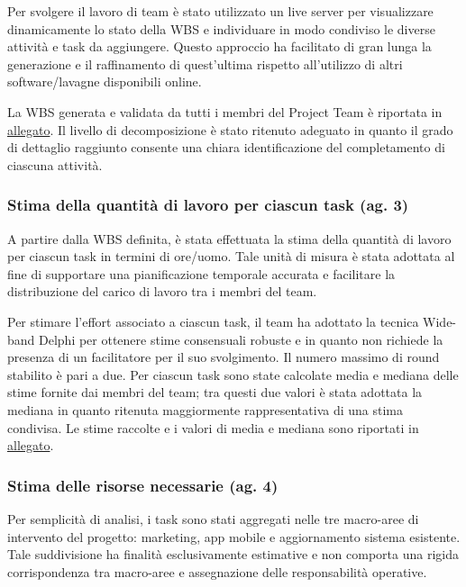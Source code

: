 \documentclass[11pt,a4paper]{article}
\begin{document}
{Per svolgere il lavoro di team è stato utilizzato un live server per visualizzare dinamicamente lo stato della WBS e individuare in modo condiviso le diverse attività e task da aggiungere. Questo approccio ha facilitato di gran lunga la generazione e il raffinamento di quest’ultima rispetto all’utilizzo di altri software/lavagne disponibili online.}

{La WBS generata e validata da tutti i membri del Project Team è riportata in \hyperref[sec:wbs]{allegato}. Il livello di decomposizione è stato ritenuto adeguato in quanto il grado di dettaglio raggiunto consente una chiara identificazione del completamento di ciascuna attività. }

\subsubsection{\texorpdfstring{{Stima della quantità di lavoro per ciascun task (ag. 3)}}{Stima della quantità di lavoro per ciascun task (ag. 3)}}\label{h.guz3vsadgoq}

{A partire dalla WBS definita, è stata effettuata la stima della quantità di lavoro per ciascun task in termini di ore/uomo. Tale unità di misura è stata adottata al fine di supportare una pianificazione temporale accurata e facilitare la distribuzione del carico di lavoro tra i membri del team.}

{Per stimare l’effort associato a ciascun task, il team ha adottato la tecnica Wide-band Delphi per ottenere stime consensuali robuste e in quanto non richiede la presenza di un facilitatore per il suo svolgimento. Il numero massimo di round stabilito è pari a due. Per ciascun task sono state calcolate media e mediana delle stime fornite dai membri del team; tra questi due valori è stata adottata la mediana in quanto ritenuta maggiormente rappresentativa di una stima condivisa. Le stime raccolte e i valori di media e mediana sono riportati in \hyperref[sec:stime]{allegato}. }

\subsubsection{\texorpdfstring{{Stima delle risorse necessarie (ag. 4)}}{Stima delle risorse necessarie (ag. 4)}}\label{h.z5ofgy59hukm}

{Per semplicità di analisi, i task sono stati aggregati nelle tre macro-aree di intervento del progetto: marketing, app mobile e aggiornamento sistema esistente. Tale suddivisione ha finalità esclusivamente estimative e non comporta una rigida corrispondenza tra macro-aree e assegnazione delle responsabilità operative.}
\end{document}
